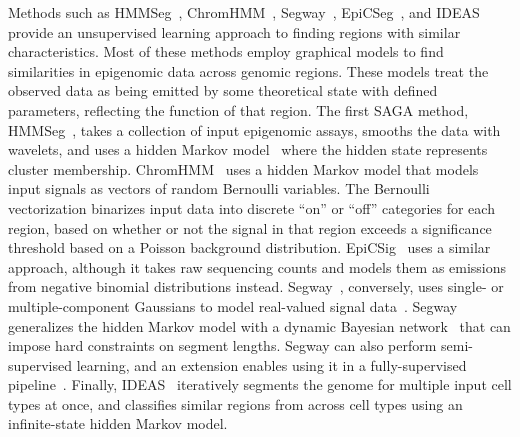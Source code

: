 \documentclass[5p]{elsarticle}
\newcommand{\rev}[1]{{\color{black}#1}}
\begin{document}
\rev{Methods such as HMMSeg~\cite{Day2007UnsupervisedData}, ChromHMM~\cite{Ernst2012ChromHMM:Characterization}, Segway~\cite{Hoffman2012UnsupervisedSegmentation}, EpiCSeg~\cite{Mammana2015ChromatinEpigenome}, and IDEAS~\cite{Zhang2016JointlyTypes}} provide an unsupervised learning approach to finding regions with similar characteristics.
Most of these methods employ graphical models to find similarities in epigenomic data across genomic regions.
These models treat the observed data as being emitted by some theoretical state with defined parameters, reflecting the function of that region.
The first SAGA method, HMMSeg~\cite{Day2007UnsupervisedData}, takes a collection of input epigenomic assays, smooths the data with wavelets, and uses a hidden Markov model~\cite{Rabiner1989ARecognition,Baum1970AChains,Baum1966StatisticalChains,Baum1972AnProcess,AmericanMathematicalSociety.1968PacificMathematics,Blakley1964HomogeneousTransformations} where the hidden state represents cluster membership.
ChromHMM~\cite{Ernst2012ChromHMM:Characterization} uses a hidden Markov model that models input signals as vectors of random Bernoulli variables.
The Bernoulli vectorization binarizes input data into discrete ``on'' or ``off'' categories for each region, based on whether or not the signal in that region exceeds a significance threshold based on a Poisson background distribution.
EpiCSig~\cite{Mammana2015ChromatinEpigenome} uses a similar approach, although it takes raw sequencing counts and models them as emissions from negative binomial distributions instead.
Segway~\cite{Hoffman2012UnsupervisedSegmentation}, conversely, uses single- or multiple-component Gaussians to model real-valued signal data~\cite{Chan2018SegwayTraining}.
Segway generalizes the hidden Markov model with a dynamic Bayesian network~\cite{Dagum1995UncertainForecasting} that can impose hard constraints on segment lengths.
Segway can also perform semi-supervised learning, and an extension enables using it in a fully-supervised pipeline~\cite{Libbrecht2018ATypes}.
\rev{Finally, IDEAS~\cite{Zhang2016JointlyTypes} iteratively} segments the genome for multiple input cell types at once, and classifies similar regions from across cell types using an infinite-state hidden Markov model.
\end{document}
